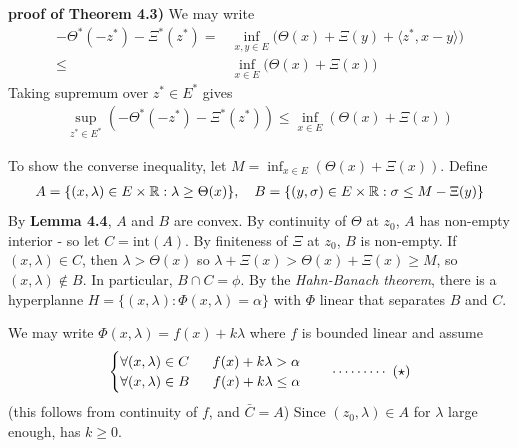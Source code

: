 \documentclass[12pt,a4paper]{article}
\newenvironment{proof}
{\begin{changemargin}{1cm}{0.5cm} 
	}%
	{\end{changemargin}
}
\newenvironment{p}
{\begin{proof} 
	}%
	{\end{proof}
}
\begin{document}
\begin{p}
\textbf{proof of Theorem 4.3)} We may write
\begin{align*}
- \Theta^*( - z^*) - \Xi^*(z^*) = & \inf_{x,y\in E} \Big( \Theta(x) + \Xi(y) + \langle z^*, x-y \rangle \Big) \\
\leq & \inf_{x\in E} \big( \Theta(x) + \Xi(x) \big)
\end{align*}
Taking supremum over $z^*\in E^*$ gives
\begin{align*}
\sup_{z^*\in E^*} (-\Theta^*(-z^*) - \Xi^*(z^*)) \leq \inf_{x\in E} (\Theta(x) + \Xi(x))
\end{align*}
\s

To show the converse inequality, let $M = \inf_{x\in E} (\Theta(x) + \Xi(x))$. Define
\begin{align*}
A = \{(x, \lambda) \in E \times \mathbb{R} : \lambda \geq \Theta(x)\}, \quad B =\{(y, \sigma) \in E\times \mathbb{R} : \sigma \leq M- \Xi(y) \}
\end{align*}
By \textbf{Lemma 4.4}, $A$ and $B$ are convex. By continuity of $\Theta$ at $z_0$, $A$ has non-empty interior - so let $C =\text{int}(A)$. By finiteness of $\Xi$ at $z_0$, $B$ is non-empty. If $(x, \lambda) \in C$, then $\lambda > \Theta(x)$ so $\lambda + \Xi(x) > \Theta(x) + \Xi(x) \geq M$, so $(x, \lambda) \not\in B$. In particular, $B\cap C = \phi$. By the \emph{Hahn-Banach theorem}, there is a hyperplanne $H = \{(x, \lambda) : \Phi(x, \lambda) = \alpha \}$ with $\Phi$ linear that separates $B$ and $C$.

\quad We may write $\Phi(x,\lambda) = f(x)+ k\lambda$ where $f$ is bounded linear and assume
\begin{align*}
\begin{cases}
\forall (x, \lambda) \in C \,\,  \quad \,\, f(x) +k\lambda > \alpha \\
\forall (x,\lambda) \in B \,\, \quad \,\, f(x) + k\lambda \leq \alpha 
\end{cases} \quad \cdots\cdots\cdots\,\,(\star)
\end{align*}
(this follows from continuity of $f$, and $\bar{C} =A$) Since $(z_0, \lambda) \in A$ for $\lambda$ large enough, has $k\geq 0$.


\end{p}
\end{document}
